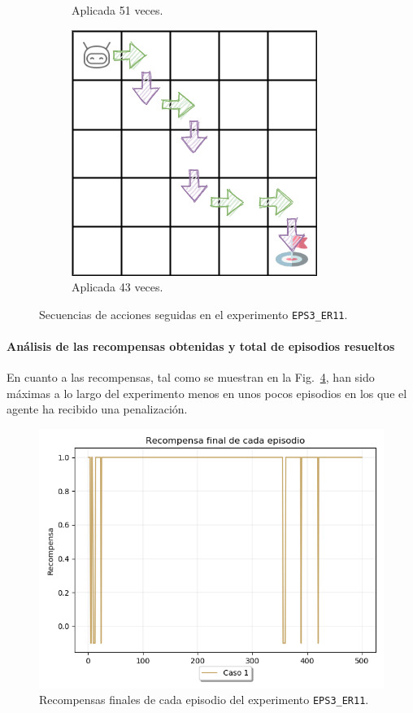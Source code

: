 \begin{figure}
\begin{subfigure}{.5\textwidth}
        \caption{Aplicada 51 veces.}
        \label{fig:dim5_lr0.01_ep1_51}
    \end{subfigure}%
    \begin{subfigure}{.5\textwidth}
        \centering
        \includegraphics[scale=0.4]{cap5_experimentacion/images/dim5_lr0.01_ep1_43.png}
        \caption{Aplicada 43 veces.}
        \label{fig:dim5_lr0.01_ep1_43}
    \end{subfigure}
    \caption{Secuencias de acciones seguidas en el experimento \texttt{EPS3\_ER11}.}
    \label{fig:dim5_lr0.01_ep1}
\end{figure}

\paragraph{Análisis de las recompensas obtenidas y total de episodios resueltos} 

En cuanto a las recompensas, tal como se muestran en la Fig.~\ref{fig:dim5_lr0.01_ep1_recompensa}, han sido máximas a lo largo del experimento menos en unos pocos episodios en los que el agente ha recibido una penalización. \\
  
\begin{figure}
    \centering
    \includegraphics[scale=0.4]{cap5_experimentacion/images/dim5_lr0.01_ep1_recompensa.png}
    \caption{Recompensas finales de cada episodio del experimento \texttt{EPS3\_ER11}.}
    \label{fig:dim5_lr0.01_ep1_recompensa}
\end{figure}

